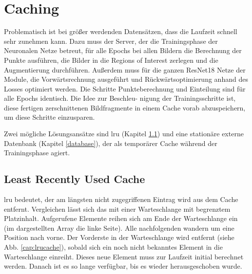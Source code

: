 \clearpage
\section{Caching}\label{caching}
Problematisch ist bei größer werdenden Datensätzen, dass die Laufzeit schnell sehr zunehmen kann. Dazu muss der Server, der die Trainingsphase der Neuronalen Netze betreut, für alle Epochs bei allen Bildern die Berechnung der Punkte ausführen, die Bilder in die Regions of Interest zerlegen und die Augmentierung durchführen. Außerdem muss für die ganzen ResNet18 Netze der Module, die Vorwärtsrechnung ausgeführt und Rückwärtsoptimierung anhand des Losses optimiert werden. Die Schritte Punkteberechnung und Einteilung sind für alle Epochs identisch. Die Idee zur Beschleu- nigung der Trainingsschritte ist, diese fertigen zerschnittenen Bildfragmente in einem Cache vorab abzuspeichern, um diese Schritte einzusparen.

Zwei mögliche Lösungsansätze sind \ac{lru} (Kapitel \ref{lrucache}) und eine stationäre externe Datenbank (Kapitel \ref{database}), der als temporärer Cache während der Trainingsphase agiert.

\subsection{Least Recently Used Cache}\label{lrucache}
\ac{lru} bedeutet, der am längsten nicht zugegriffenen Eintrag wird aus dem Cache entfernt. Vergleichen lässt sich das mit einer Warteschlange mit begrenztem Platzinhalt. Aufgerufene Elemente reihen sich am Ende der Warteschlange ein (im dargestellten Array die linke Seite). Alle nachfolgenden wandern um eine Position nach vorne. Der Vorderste in der Warteschlange wird entfernt (siehe Abb. \ref{cap:lrucache}), sobald sich ein noch nicht bekanntes Element in die Warteschlange einreiht. Dieses neue Element muss zur Laufzeit initial berechnet werden. Danach ist es so lange verfügbar, bis es wieder herausgeschoben wurde.

